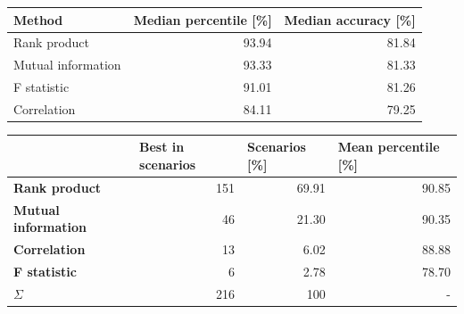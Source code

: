 \begin{table}[h]
\centering
\begin{tabular}{|l|r|r|}
\hline
\textbf{Method}    & \multicolumn{1}{l|}{\textbf{Median percentile {[}\%{]}}} & \multicolumn{1}{l|}{\textbf{Median accuracy {[}\%{]}}} \\ \hline
Rank product       & 93.94                                                    & 81.84                                                  \\ \hline
Mutual information & 93.33                                                    & 81.33                                                  \\ \hline
F statistic        & 91.01                                                    & 81.26                                                  \\ \hline
Correlation        & 84.11                                                    & 79.25                                                  \\ \hline
\end{tabular}
\end{table}

\begin{table}[h]
\centering
\begin{tabular}{|l|r|r|r|}
\hline
                            & \multicolumn{1}{l|}{\textbf{Best in scenarios}} & \multicolumn{1}{l|}{\textbf{Scenarios {[}\%{]}}} & \multicolumn{1}{l|}{\textbf{Mean percentile {[}\%{]}}} \\ \hline
\textbf{Rank product}       & 151                                                     & 69.91                                            & 90.85                                                  \\ \hline
\textbf{Mutual information} & 46                                                      & 21.30                                            & 90.35                                                  \\ \hline
\textbf{Correlation}        & 13                                                      & 6.02                                             & 88.88                                                  \\ \hline
\textbf{F statistic}        & 6                                                       & 2.78                                             & 78.70                                                  \\ \hline
\textbf{$\Sigma$}           & 216                                                     & 100                                       & -                                                      \\ \hline
\end{tabular}
\end{table}

